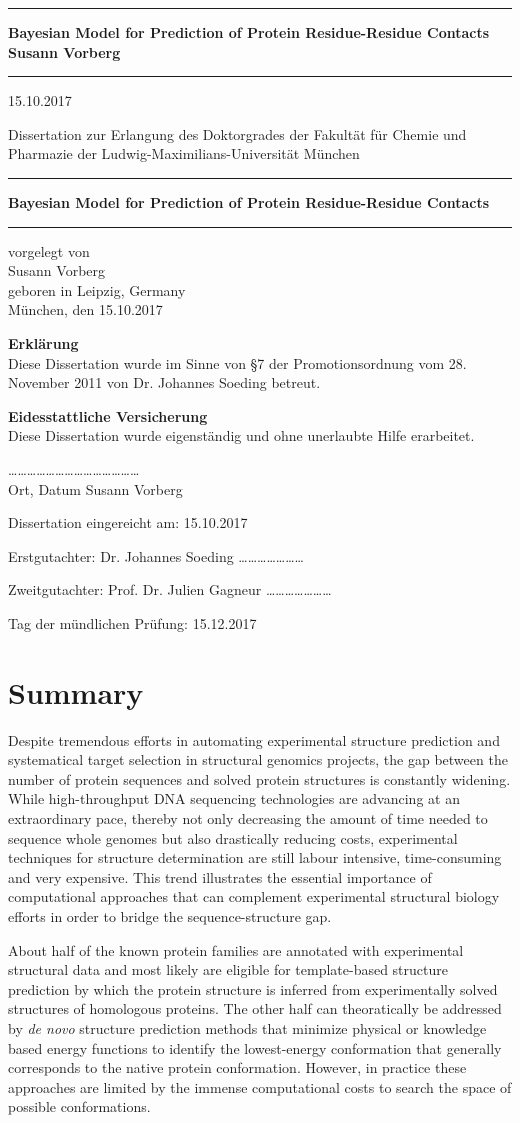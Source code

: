 \documentclass[11pt,a4paper,twoside]{book}
\newcommand{\LMUCover}[3]{
    \thispagestyle{empty}
    {\parindent0cm \rule{\linewidth}{.7ex}}
    
    \begin{flushright}
      \vspace*{\stretch{1}}
      \sffamily\bfseries\Huge
      #1\\
      \vspace*{\stretch{1}}
      \sffamily\bfseries\large
      #2
      \vspace*{\stretch{1}}
    \end{flushright}
  
    \rule{\linewidth}{.7ex}
    \vspace*{\stretch{5}}
    \vspace*{\stretch{1}}
    
    \begin{center}\sffamily\LARGE{#3}\end{center}
}
\newcommand{\LMUTitlePage}[4]{
    \thispagestyle{empty}
    \vspace*{\stretch{1}}
    
    \begin{center}
      \Large Dissertation zur Erlangung des Doktorgrades der Fakultät für Chemie und Pharmazie der Ludwig-Maximilians-Universität München
    \end{center}
    
    \vspace*{\stretch{1}}
    {\parindent0cm \rule{\linewidth}{.7ex}}
    
    \begin{flushright}
      \vspace*{\stretch{1}}
      \sffamily\bfseries\Huge
      #1\\
      \vspace*{\stretch{1}}
    \end{flushright}
  
    \rule{\linewidth}{.7ex}

    \vspace*{\stretch{3}}
    \begin{center}
      \Large vorgelegt von\\
      \Large #2\\
      \Large geboren in #3\\
      \vspace*{\stretch{2}}
      \Large München, den #4
    \end{center}
}
\newcommand{\LMUErklaerung}[5]{
    \thispagestyle{empty}
    \begin{flushleft}
      \large \textbf{Erklärung} \\[1mm]
      \large Diese Dissertation wurde im Sinne von §7 der Promotionsordnung vom 28. November 2011 von #2 betreut.
      \bigskip
  
      \large \textbf{Eidesstattliche Versicherung}\\[1mm]
      \large Diese Dissertation wurde eigenständig und ohne unerlaubte Hilfe erarbeitet.
      \vspace{5em}
  
      \dots\dots\dots   \dots\dots\dots \hfill \dots\dots\dots\dots\dots\dots\dots\dots\\
      \large Ort, Datum \hfill #1
      \vfill
  
  
      \large Dissertation eingereicht am: \hfill #4
      \bigskip
    
      \large Erstgutachter:  #2 \hfill \dots\dots\dots\dots\dots\dots\dots
      \bigskip
    
      \large Zweitgutachter: #3 \hfill \dots\dots\dots\dots\dots\dots\dots
      \bigskip
    
      \large Tag der mündlichen Prüfung: \hfill #5
    \end{flushleft}
}
\theoremstyle{definition}
\theoremstyle{definition}
\theoremstyle{remark}
\begin{document}
\frontmatter

\LMUCover
	{Bayesian Model for Prediction of Protein Residue-Residue Contacts}
	{Susann Vorberg}
	{15.10.2017}

\newpage
\thispagestyle{empty}
\cleardoublepage

\LMUTitlePage
	{Bayesian Model for Prediction of Protein Residue-Residue Contacts}
	{Susann Vorberg}
	{Leipzig, Germany}
	{15.10.2017}

\newpage
\thispagestyle{empty}
\cleardoublepage

\LMUErklaerung
	{Susann Vorberg}
	{Dr. Johannes Soeding}
	{Prof. Dr. Julien Gagneur}
	{15.10.2017}
	{15.12.2017}

\newpage
\thispagestyle{empty}
\cleardoublepage
\frontmatter\setcounter{page}{1}

\chapter*{Summary}\label{summary}

Despite tremendous efforts in automating experimental structure
prediction and systematical target selection in structural genomics
projects, the gap between the number of protein sequences and solved
protein structures is constantly widening. While high-throughput DNA
sequencing technologies are advancing at an extraordinary pace, thereby
not only decreasing the amount of time needed to sequence whole genomes
but also drastically reducing costs, experimental techniques for
structure determination are still labour intensive, time-consuming and
very expensive. This trend illustrates the essential importance of
computational approaches that can complement experimental structural
biology efforts in order to bridge the sequence-structure gap.

About half of the known protein families are annotated with experimental
structural data and most likely are eligible for template-based
structure prediction by which the protein structure is inferred from
experimentally solved structures of homologous proteins. The other half
can theoratically be addressed by \emph{de novo} structure prediction
methods that minimize physical or knowledge based energy functions to
identify the lowest-energy conformation that generally corresponds to
the native protein conformation. However, in practice these approaches
are limited by the immense computational costs to search the space of
possible conformations.
\end{document}
